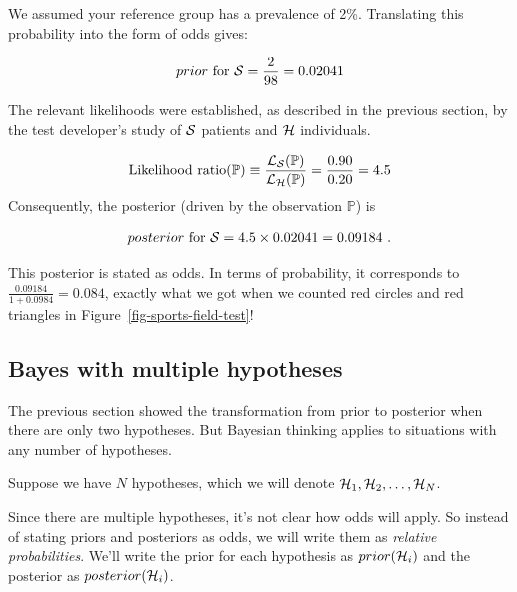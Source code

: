 \documentclass[
  letterpaper,
  DIV=11,
  numbers=noendperiod,
  oneside]{scrartcl}
\begin{document}
\begin{tcolorbox}[enhanced jigsaw, colbacktitle=quarto-callout-note-color!10!white, opacityback=0, breakable, opacitybacktitle=0.6, colback=white, coltitle=black, arc=.35mm, title=\textcolor{quarto-callout-note-color}{\faInfo}\hspace{0.5em}{Example calculation}, left=2mm, colframe=quarto-callout-note-color-frame, rightrule=.15mm, bottomrule=.15mm, leftrule=.75mm, bottomtitle=1mm, toptitle=1mm, titlerule=0mm, toprule=.15mm]

We assumed your reference group has a prevalence of 2\%. Translating
this probability into the form of odds gives:

\[prior\ \text{for}\ {\cal S}= \frac{2}{98} = 0.02041\]

The relevant likelihoods were established, as described in the previous
section, by the test developer's study of \({\cal S}\) patients and
\({\cal H}\) individuals.

\[\text{Likelihood ratio}({\mathbb{P}}) \equiv\frac{{\cal L}_{\cal S}({\mathbb{P}})}{{\cal L}_{\cal H}({\mathbb{P}})} = \frac{0.90}{0.20} = 4.5\]
Consequently, the posterior (driven by the observation \({\mathbb{P}}\))
is

\[posterior\ \text{for } {\cal S}= 4.5 \times 0.02041 = 0.09184\ .\]

This posterior is stated as odds. In terms of probability, it
corresponds to \(\frac{0.09184}{1 + 0.0984} = 0.084\), exactly what we
got when we counted red circles and red triangles in
Figure~\ref{fig-sports-field-test}!

\end{tcolorbox}

\subsection{Bayes with multiple
hypotheses}\label{bayes-with-multiple-hypotheses}

The previous section showed the transformation from prior to posterior
when there are only two hypotheses. But Bayesian thinking applies to
situations with any number of hypotheses.

Suppose we have \(N\) hypotheses, which we will denote
\({\cal H}_1, {\cal H}_2, \ldots, {\cal H}_N\).

Since there are multiple hypotheses, it's not clear how odds will apply.
So instead of stating priors and posteriors as odds, we will write them
as \emph{relative probabilities}. We'll write the prior for each
hypothesis as \(prior({\cal H}_i)\) and the posterior as
\(posterior({\cal H}_i)\).
\end{document}
